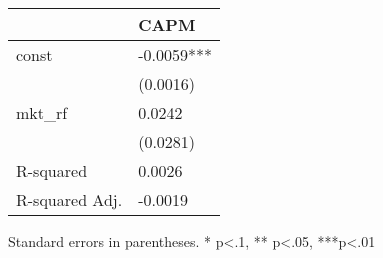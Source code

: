 \begin{table}
\caption{}
\label{}
\begin{center}
\begin{tabular}{ll}
\hline
               & CAPM        \\
\hline
const          & -0.0059***  \\
               & (0.0016)    \\
mkt\_rf        & 0.0242      \\
               & (0.0281)    \\
R-squared      & 0.0026      \\
R-squared Adj. & -0.0019     \\
\hline
\end{tabular}
\end{center}
\end{table}
\bigskip
Standard errors in parentheses. \newline 
* p<.1, ** p<.05, ***p<.01